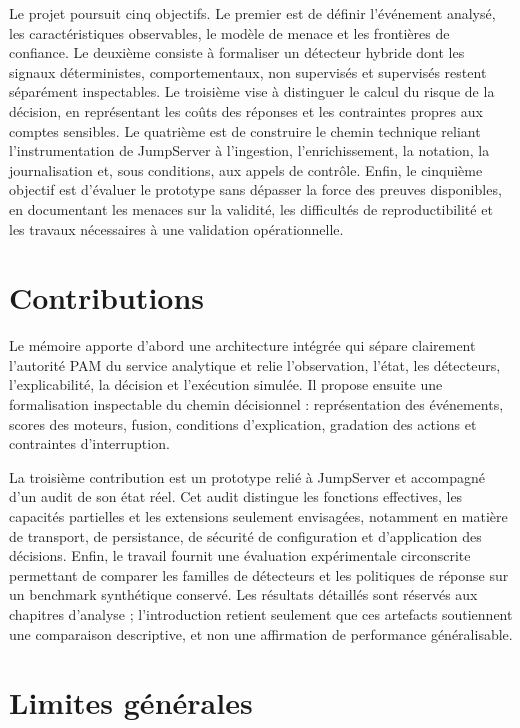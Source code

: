 \documentclass[11pt,a4paper,oneside]{report}
\theoremstyle{definition}
\theoremstyle{plain}
\begin{document}
Le projet poursuit cinq objectifs. Le premier est de définir l'événement
analysé, les caractéristiques observables, le modèle de menace et les
frontières de confiance. Le deuxième consiste à formaliser un détecteur
hybride dont les signaux déterministes, comportementaux, non supervisés et
supervisés restent séparément inspectables. Le troisième vise à distinguer le
calcul du risque de la décision, en représentant les coûts des réponses et les
contraintes propres aux comptes sensibles. Le quatrième est de construire le
chemin technique reliant l'instrumentation de JumpServer à l'ingestion,
l'enrichissement, la notation, la journalisation et, sous conditions, aux
appels de contrôle. Enfin, le cinquième objectif est d'évaluer le prototype
sans dépasser la force des preuves disponibles, en documentant les menaces sur
la validité, les difficultés de reproductibilité et les travaux nécessaires à
une validation opérationnelle.

\section{Contributions}
\label{sec:intro-contributions}

Le mémoire apporte d'abord une architecture intégrée qui sépare clairement
l'autorité PAM du service analytique et relie l'observation, l'état, les
détecteurs, l'explicabilité, la décision et l'exécution simulée. Il propose
ensuite une formalisation inspectable du chemin décisionnel : représentation
des événements, scores des moteurs, fusion, conditions d'explication,
gradation des actions et contraintes d'interruption.

La troisième contribution est un prototype relié à JumpServer et accompagné
d'un audit de son état réel. Cet audit distingue les fonctions effectives, les
capacités partielles et les extensions seulement envisagées, notamment en
matière de transport, de persistance, de sécurité de configuration et
d'application des décisions. Enfin, le travail fournit une évaluation
expérimentale circonscrite permettant de comparer les familles de détecteurs
et les politiques de réponse sur un benchmark synthétique conservé. Les
résultats détaillés sont réservés aux chapitres d'analyse ; l'introduction
retient seulement que ces artefacts soutiennent une comparaison descriptive,
et non une affirmation de performance généralisable.

\section{Limites générales}
\label{sec:intro-limitations}
\end{document}
